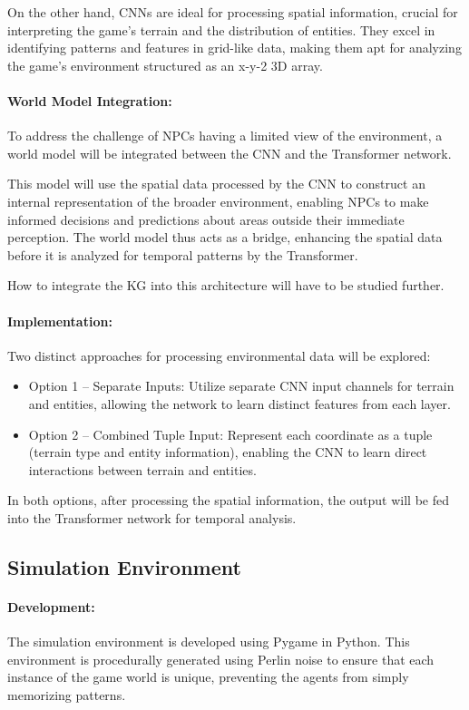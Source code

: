 \documentclass{article}
\begin{document}
On the other hand, CNNs are ideal for processing spatial information, crucial for interpreting the game’s terrain and the distribution of entities. They excel in identifying patterns and features in grid-like data, making them apt for analyzing the game's environment structured as an x-y-2 3D array.

\paragraph{World Model Integration:}
To address the challenge of NPCs having a limited view of the environment, a world model will be integrated between the CNN and the Transformer network.

This model will use the spatial data processed by the CNN to construct an internal representation of the broader environment, enabling NPCs to make informed decisions and predictions about areas outside their immediate perception. The world model thus acts as a bridge, enhancing the spatial data before it is analyzed for temporal patterns by the Transformer.

How to integrate the KG into this architecture will have to be studied further.

\paragraph{Implementation:}
Two distinct approaches for processing environmental data will be explored:
\begin{itemize}
    \item Option 1 – Separate Inputs: Utilize separate CNN input channels for terrain and entities, allowing the network to learn distinct features from each layer.
    \item Option 2 – Combined Tuple Input: Represent each coordinate as a tuple (terrain type and entity information), enabling the CNN to learn direct interactions between terrain and entities.
\end{itemize}
In both options, after processing the spatial information, the output will be fed into the Transformer network for temporal analysis.


\subsection{Simulation Environment}
\paragraph{Development:}
The simulation environment is developed using Pygame in Python. This environment is procedurally generated using Perlin noise to ensure that each instance of the game world is unique, preventing the agents from simply memorizing patterns.
\end{document}

